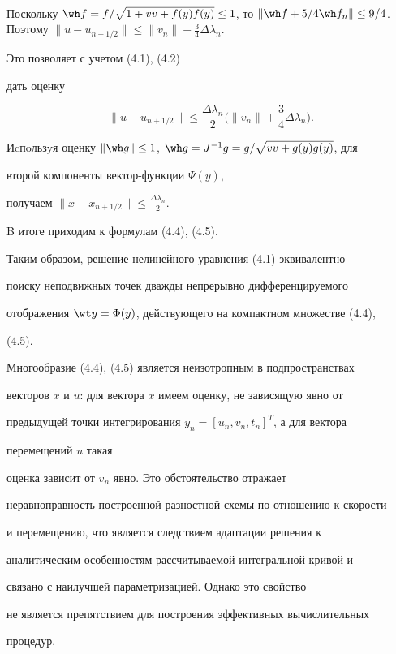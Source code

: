 \begin{pf}
\begin{multline*}
\end{multline*} 


 


Поскольку $\wh f=f/ \sqrt{1+vv+f(y)f(y)}\le1$, то $\|\wh f+5/4\wh f_n\|\le 


9/4$. Поэтому $\|u-u_{n+1/2}\|\le\|v_n\|+\frac{3}{4}\Delta\lambda_n$. 


Это позволяет с учетом (4.1), (4.2) 


дать оценку 


$$ 


\|u-u_{n+1/2}\|\le\frac{\Delta\lambda_n}{2}\bigg(\|v_n\|+ 


\frac{3}{4}\Delta\lambda_n\bigg). 


$$ 


Иcпoльзyя оценку $\|\wh g\|\le1$, $\wh g=J^{-1}g=g/ \sqrt{vv+g(y)g(y)}$, для 


второй компоненты вектор-функции $\Psi(y)$, 


получаем $\|x-x_{n+1/2}\|\le\frac{\Delta\lambda_n}{2}$. 


 


B итоге приходим к формулам (4.4), (4.5). 


\end{pf} 


 


Таким образом, решение нелинейного уравнения (4.1) эквивалентно 


поиску неподвижных точек дважды непрерывно дифференцируемого 


отображения $\wt y=\Phi(y)$, действующего на компактном множестве (4.4), 


(4.5). 


 


\begin{notenonum} 


Многообразие (4.4), (4.5) является неизотропным в подпространствах 


векторов $x$ и $u$: для вектора $x$ имеем оценку, не зависящую явно от 


предыдущей точки интегрирования $y_n=[u_n,v_n,t_n]^T$, а для вектора 


перемещений $u$ такая 


оценка зависит от $v_n$ явно. Это обстоятельство отражает 


неравноправность построенной разностной схемы по отношению к скорости 


и перемещению, что является следствием адаптации решения к 


аналитическим особенностям рассчитываемой интегральной кривой и 


связано с наилучшей параметризацией. Однако это свойство 


не является препятствием для построения эффективных вычислительных 


процедур. 


\end{notenonum} 


